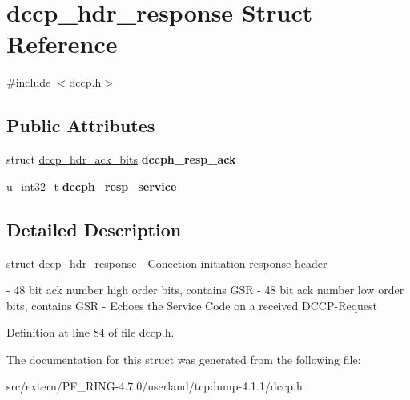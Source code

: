 \hypertarget{structdccp__hdr__response}{
\section{dccp\_\-hdr\_\-response Struct Reference}
\label{structdccp__hdr__response}
}


{\ttfamily \#include $<$dccp.h$>$}

\subsection*{Public Attributes}
\begin{DoxyCompactItemize}
\item 
\hypertarget{structdccp__hdr__response_ae56b2ae55faca3b6499cf270183a0b1f}{
struct \hyperlink{structdccp__hdr__ack__bits}{dccp\_\-hdr\_\-ack\_\-bits} {\bfseries dccph\_\-resp\_\-ack}}
\label{structdccp__hdr__response_ae56b2ae55faca3b6499cf270183a0b1f}

\item 
\hypertarget{structdccp__hdr__response_a9ad4ca9d1f1942bc1feb567516c5fa8e}{
u\_\-int32\_\-t {\bfseries dccph\_\-resp\_\-service}}
\label{structdccp__hdr__response_a9ad4ca9d1f1942bc1feb567516c5fa8e}

\end{DoxyCompactItemize}


\subsection{Detailed Description}
struct \hyperlink{structdccp__hdr__response}{dccp\_\-hdr\_\-response} -\/ Conection initiation response header

-\/ 48 bit ack number high order bits, contains GSR  -\/ 48 bit ack number low order bits, contains GSR  -\/ Echoes the Service Code on a received DCCP-\/Request 

Definition at line 84 of file dccp.h.



The documentation for this struct was generated from the following file:\begin{DoxyCompactItemize}
\item 
src/extern/PF\_\-RING-\/4.7.0/userland/tcpdump-\/4.1.1/dccp.h\end{DoxyCompactItemize}
